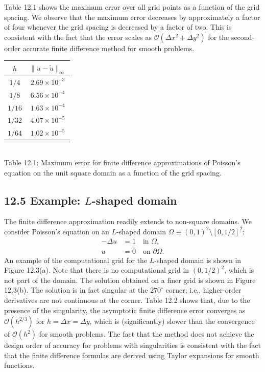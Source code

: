 
Table 12.1 shows the maximum error over all grid points as a function of the grid spacing. We observe that the maximum error decreases by approximately a factor of four whenever the grid spacing is decreased by a factor of two. This is consistent with the fact that the error scales as $\mathcal{O}(\Delta x^2 + \Delta y^2)$ for the second-order accurate finite difference method for smooth problems.

\begin{center}
    \begin{tabular}{cc}
        $h$ & $\|u - \tilde{u}\|_\infty$ \\
        \hline
        $1/4$ & $2.69 \times 10^{-3}$ \\
        $1/8$ & $6.56 \times 10^{-4}$ \\
        $1/16$ & $1.63 \times 10^{-4}$ \\
        $1/32$ & $4.07 \times 10^{-5}$ \\
        $1/64$ & $1.02 \times 10^{-5}$
    \end{tabular}\\[4pt]
    {\small Table 12.1: Maximum error for finite difference approximations of Poisson's equation on the unit square domain as a function of the grid spacing.}
\end{center}

\subsection{12.5 Example: $L$-shaped domain}
The finite difference approximation readily extends to non-square domains. We consider Poisson's equation on an $L$-shaped domain $\Omega \equiv (0, 1)^2 \setminus [0, 1/2]^2$:
\begin{align*}
    -\Delta u &= 1 \quad \text{in } \Omega, \\
    u &= 0 \quad \text{on } \partial\Omega.
\end{align*}
An example of the computational grid for the $L$-shaped domain is shown in Figure 12.3(a). Note that there is no computational grid in $(0, 1/2)^2$, which is not part of the domain. The solution obtained on a finer grid is shown in Figure 12.3(b). The solution is in fact singular at the $270^\circ$ corner; i.e., higher-order derivatives are not continuous at the corner. Table 12.2 shows that, due to the presence of the singularity, the asymptotic finite difference error converges as $\mathcal{O}(h^{2/3})$ for $h = \Delta x = \Delta y$, which is (significantly) slower than the convergence of $\mathcal{O}(h^2)$ for smooth problems. The fact that the method does not achieve the design order of accuracy for problems with singularities is consistent with the fact that the finite difference formulas are derived using Taylor expansions for smooth functions.

